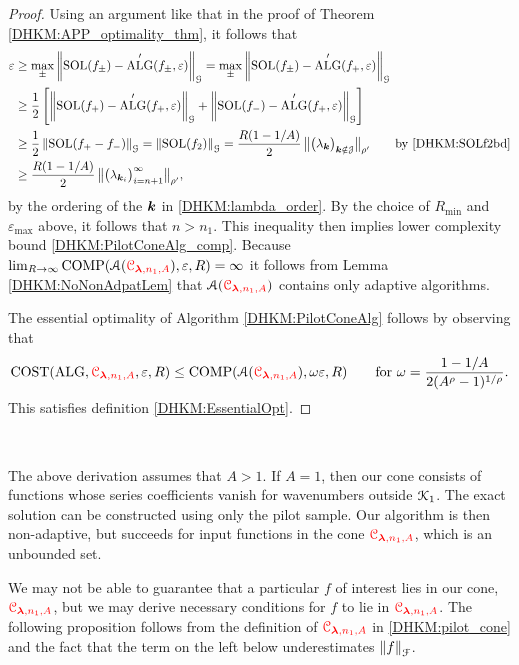 \documentclass[USenglish]{article}
\theoremstyle{dgthm}
\theoremstyle{dgthm}
\theoremstyle{dgthm}
\theoremstyle{dgthm}
\theoremstyle{dgdef}
\theoremstyle{definition}
\DeclareMathOperator{\SOL}{SOL}
\DeclareMathOperator{\ALG}{ALG}
\DeclareMathOperator{\COST}{COST}
\DeclareMathOperator{\COMP}{COMP}
\newcommand{\norm}[2][{}]{\ensuremath{\left \lVert #2 \right \rVert}_{#1}}
\newcommand{\bignorm}[2][{}]{\ensuremath{\bigl \lVert #2 \bigr \rVert}_{#1}}
\newcommand{\DHKMchange}[1]{{\color{red}{#1}}}
\begin{document}
\begin{proof}
Using an argument like that in the proof of  Theorem \ref{DHKM:APP_optimality_thm}, it follows that 
\begin{align*}
\varepsilon & \ge \max_{\pm} \norm[\calG]{\SOL(f_{\pm}) - \ALG'(f_{\pm},\varepsilon)} 
=  \max_{\pm} \norm[\calG]{\SOL(f_{\pm}) - \ALG'(f_{+},\varepsilon)} \\
& \ge \frac 12 \left [ \norm[\calG]{\SOL(f_{+}) - \ALG'(f_{+},\varepsilon)} 
+ \norm[\calG]{\SOL(f_{-}) - \ALG'(f_{+},\varepsilon)}  \right] \\
& \ge \frac 12 \norm[\calG]{\SOL(f_+ - f_-)} = \norm[\calG]{\SOL(f_2)} 
=\frac{R(1 - 1/A)}{2} \, \bignorm[\rho']{\bigl(  \lambda_{\bsk}  \bigr)_{\bsk \notin \calJ}} \qquad \text{by \eqref{DHKM:SOLf2bd}} \\
& \ge \frac{R(1 - 1/A)}{2} \, \bignorm[\rho']{\bigl(  \lambda_{\bsk_i}  \bigr)_{i = n+1}^\infty},
\end{align*}
by the ordering of the ${\boldsymbol{k}}$ in \eqref{DHKM:lambda_order}.  By the choice of $R_{\min}$ and $\varepsilon_{\max}$ above, it follows that $n > n_1$.  This inequality then implies lower complexity bound \eqref{DHKM:PilotConeAlg_comp}. Because $\lim_{R \to \infty} \COMP(\calA(\DHKMchange{\calC_{\boldsymbol{\lambda},n_1,A}}), \varepsilon,R) = \infty$  it follows from Lemma \ref{DHKM:NoNonAdpatLem} that $\calA(\DHKMchange{\calC_{\boldsymbol{\lambda},n_1,A}})$ contains only adaptive algorithms.

The essential optimality of Algorithm \ref{DHKM:PilotConeAlg} follows by observing that 
\[
\COST(\ALG,\DHKMchange{\calC_{\boldsymbol{\lambda},n_1,A}},\varepsilon,R) \le \COMP(\calA(\DHKMchange{\calC_{\boldsymbol{\lambda},n_1,A}}),\omega \varepsilon,R) \qquad \text{for } \omega = \frac{1-1/A}{2(A^\rho -1)^{1/\rho}}.
\]
This satisfies definition \eqref{DHKM:EssentialOpt}.  
\end{proof} \

The above derivation assumes that $A > 1$.  If $A =1$, then our cone consists of functions whose series coefficients vanish for wavenumbers outside ${\mathcal{K}}_1$.  The exact solution can be constructed using only the pilot sample.  Our algorithm is then non-adaptive, but succeeds for input functions in the cone $\DHKMchange{\calC_{\boldsymbol{\lambda},n_1,A}}$, which is an unbounded set.

We may not be able to guarantee that a particular $f$ of interest lies in our cone, $\DHKMchange{\calC_{\boldsymbol{\lambda},n_1,A}}$, but we may derive necessary conditions for $f$ to lie in $\DHKMchange{\calC_{\boldsymbol{\lambda},n_1,A}}$.  The following proposition follows from the definition of $\DHKMchange{\calC_{\boldsymbol{\lambda},n_1,A}}$ in \eqref{DHKM:pilot_cone} and the fact that the term on the left below underestimates $\norm[\calF]{f}$.
\end{document}
